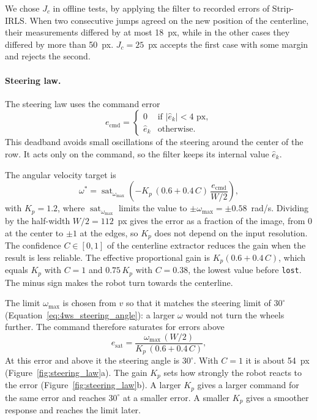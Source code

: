 We chose $J_c$ in offline tests, by applying the filter to recorded errors of Strip-IRLS. When two consecutive jumps agreed on the new position of the centerline, their measurements differed by at most 18~px, while in the other cases they differed by more than 50~px. $J_c = 25$~px accepts the first case with some margin and rejects the second.

\paragraph{Steering law.}
The steering law uses the command error
\begin{equation}
    e_{\mathrm{cmd}} =
    \begin{cases}
        0 & \text{if } |\hat{e}_k| < 4\text{ px}, \\
        \hat{e}_k & \text{otherwise}.
    \end{cases}
    \label{eq:deadband}
\end{equation}
This deadband avoids small oscillations of the steering around the center of the row. It acts only on the command, so the filter keeps its internal value $\hat{e}_k$.

The angular velocity target is
\begin{equation}
    \omega^{*} = \operatorname{sat}_{\omega_{\max}}\!\left( - K_{p} \, (0.6 + 0.4\, C) \, \frac{e_{\mathrm{cmd}}}{W/2} \right),
    \label{eq:control_law_omega}
\end{equation}
with $K_{p} = 1.2$, where $\operatorname{sat}_{\omega_{\max}}$ limits the value to $\pm\omega_{\max} = \pm 0.58$~rad/s. Dividing by the half-width $W/2 = 112$~px gives the error as a fraction of the image, from 0 at the center to $\pm 1$ at the edges, so $K_p$ does not depend on the input resolution. The confidence $C \in [0, 1]$ of the centerline extractor reduces the gain when the result is less reliable. The effective proportional gain is $K_p (0.6 + 0.4\, C)$, which equals $K_p$ with $C = 1$ and $0.75\, K_p$ with $C = 0.38$, the lowest value before \texttt{lost}. The minus sign makes the robot turn towards the centerline.

The limit $\omega_{\max}$ is chosen from $v$ so that it matches the steering limit of $30^\circ$ (Equation~\eqref{eq:4ws_steering_angle}): a larger $\omega$ would not turn the wheels further. The command therefore saturates for errors above
\begin{equation}
    e_{\mathrm{sat}} = \frac{\omega_{\max}\, (W/2)}{K_p\, (0.6 + 0.4\, C)},
    \label{eq:error_saturation}
\end{equation}
At this error and above it the steering angle is $30^\circ$. With $C = 1$ it is about 54~px (Figure~\ref{fig:steering_law}a). The gain $K_p$ sets how strongly the robot reacts to the error (Figure~\ref{fig:steering_law}b). A larger $K_p$ gives a larger command for the same error and reaches $30^\circ$ at a smaller error. A smaller $K_p$ gives a smoother response and reaches the limit later.

